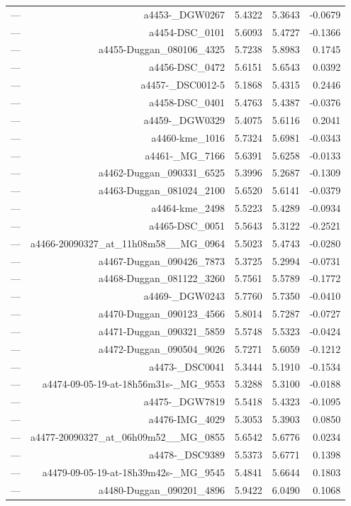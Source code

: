 \begin{table}[htbp]
\begin{tabular}{lrrrr}
— & a4453-_DGW0267 & 5.4322 & 5.3643 & -0.0679 \\
— & a4454-DSC_0101 & 5.6093 & 5.4727 & -0.1366 \\
— & a4455-Duggan_080106_4325 & 5.7238 & 5.8983 & 0.1745 \\
— & a4456-DSC_0472 & 5.6151 & 5.6543 & 0.0392 \\
— & a4457-_DSC0012-5 & 5.1868 & 5.4315 & 0.2446 \\
— & a4458-DSC_0401 & 5.4763 & 5.4387 & -0.0376 \\
— & a4459-_DGW0329 & 5.4075 & 5.6116 & 0.2041 \\
— & a4460-kme_1016 & 5.7324 & 5.6981 & -0.0343 \\
— & a4461-_MG_7166 & 5.6391 & 5.6258 & -0.0133 \\
— & a4462-Duggan_090331_6525 & 5.3996 & 5.2687 & -0.1309 \\
— & a4463-Duggan_081024_2100 & 5.6520 & 5.6141 & -0.0379 \\
— & a4464-kme_2498 & 5.5223 & 5.4289 & -0.0934 \\
— & a4465-DSC_0051 & 5.5643 & 5.3122 & -0.2521 \\
— & a4466-20090327_at_11h08m58__MG_0964 & 5.5023 & 5.4743 & -0.0280 \\
— & a4467-Duggan_090426_7873 & 5.3725 & 5.2994 & -0.0731 \\
— & a4468-Duggan_081122_3260 & 5.7561 & 5.5789 & -0.1772 \\
— & a4469-_DGW0243 & 5.7760 & 5.7350 & -0.0410 \\
— & a4470-Duggan_090123_4566 & 5.8014 & 5.7287 & -0.0727 \\
— & a4471-Duggan_090321_5859 & 5.5748 & 5.5323 & -0.0424 \\
— & a4472-Duggan_090504_9026 & 5.7271 & 5.6059 & -0.1212 \\
— & a4473-_DSC0041 & 5.3444 & 5.1910 & -0.1534 \\
— & a4474-09-05-19-at-18h56m31s-_MG_9553 & 5.3288 & 5.3100 & -0.0188 \\
— & a4475-_DGW7819 & 5.5418 & 5.4323 & -0.1095 \\
— & a4476-IMG_4029 & 5.3053 & 5.3903 & 0.0850 \\
— & a4477-20090327_at_06h09m52__MG_0855 & 5.6542 & 5.6776 & 0.0234 \\
— & a4478-_DSC9389 & 5.5373 & 5.6771 & 0.1398 \\
— & a4479-09-05-19-at-18h39m42s-_MG_9545 & 5.4841 & 5.6644 & 0.1803 \\
— & a4480-Duggan_090201_4896 & 5.9422 & 6.0490 & 0.1068 \\

\end{tabular}
\end{table}
